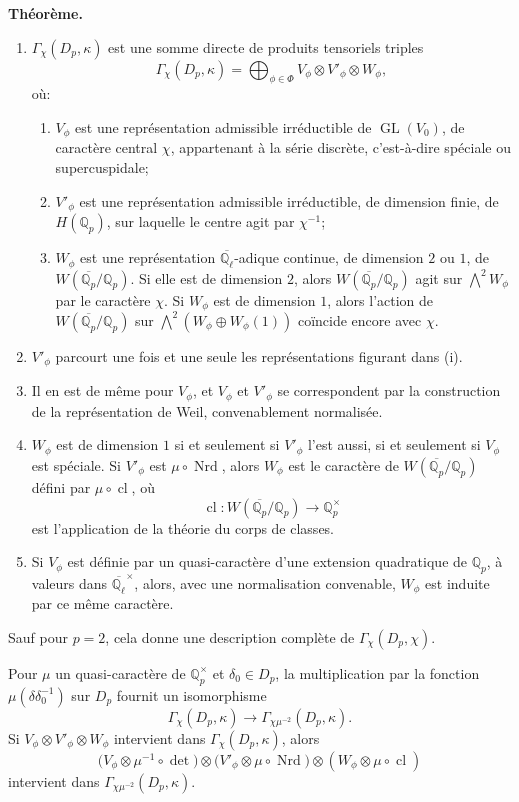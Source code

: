 \documentclass[11pt]{article}
\newcommand{\Qp}{\mathbb{Q}_{p}}
\newcommand{\Ql}{\mathbb{Q}_{\ell}}
\newcommand{\GL}{\operatorname{GL}}
\newcommand{\Nrd}{\operatorname{Nrd}}
\newcommand{\cl}{\operatorname{cl}}
\begin{document}
\textbf{Théorème.}
\begin{enumerate}[label=(\roman*)]
\item \(\Gamma_{\chi}(D_p,\kappa)\) est une somme directe de produits tensoriels triples
\[
\Gamma_{\chi}(D_p,\kappa)=
\bigoplus_{\phi\in\Phi}V_{\phi}\otimes V'_{\phi}\otimes W_{\phi},
\]
où:
\begin{enumerate}[label=(\alph*)]
\item \(V_{\phi}\) est une représentation admissible irréductible de \(\GL(V_0)\), de caractère central \(\chi\), appartenant à la série discrète, c'est-à-dire spéciale ou supercuspidale;
\item \(V'_{\phi}\) est une représentation admissible irréductible, de dimension finie, de \(H(\Qp)\), sur laquelle le centre agit par \(\chi^{-1}\);
\item \(W_{\phi}\) est une représentation \(\overline{\Ql}\)-adique continue, de dimension \(2\) ou \(1\), de \(W(\overline{\Qp}/\Qp)\). Si elle est de dimension \(2\), alors \(W(\overline{\Qp}/\Qp)\) agit sur \(\bigwedge^2W_{\phi}\) par le caractère \(\chi\). Si \(W_{\phi}\) est de dimension \(1\), alors l'action de \(W(\overline{\Qp}/\Qp)\) sur \(\bigwedge^2(W_{\phi}\oplus W_{\phi}(1))\) coïncide encore avec \(\chi\).
\end{enumerate}
\item \(V'_{\phi}\) parcourt une fois et une seule les représentations figurant dans (i).
\item Il en est de même pour \(V_{\phi}\), et \(V_{\phi}\) et \(V'_{\phi}\) se correspondent par la construction de la représentation de Weil, convenablement normalisée.
\item \(W_{\phi}\) est de dimension \(1\) si et seulement si \(V'_{\phi}\) l'est aussi, si et seulement si \(V_{\phi}\) est spéciale. Si \(V'_{\phi}\) est \(\mu\circ\Nrd\), alors \(W_{\phi}\) est le caractère de \(W(\overline{\Qp}/\Qp)\) défini par \(\mu\circ\cl\), où
\[
\cl:W(\overline{\Qp}/\Qp)\to\Qp^\times
\]
est l'application de la théorie du corps de classes.
\item Si \(V_{\phi}\) est définie par un quasi-caractère d'une extension quadratique de \(\Qp\), à valeurs dans \(\overline{\Ql}^{\times}\), alors, avec une normalisation convenable, \(W_{\phi}\) est induite par ce même caractère.
\end{enumerate}

Sauf pour \(p=2\), cela donne une description complète de \(\Gamma_{\chi}(D_p,\chi)\).

Pour \(\mu\) un quasi-caractère de \(\Qp^\times\) et \(\delta_0\in D_p\), la multiplication par la fonction \(\mu(\delta\delta_0^{-1})\) sur \(D_p\) fournit un isomorphisme
\[
\Gamma_{\chi}(D_p,\kappa)\longrightarrow
\Gamma_{\chi\mu^{-2}}(D_p,\kappa).
\]
Si \(V_{\phi}\otimes V'_{\phi}\otimes W_{\phi}\) intervient dans \(\Gamma_{\chi}(D_p,\kappa)\), alors
\[
\bigl(V_{\phi}\otimes\mu^{-1}\circ\det\bigr)\otimes
\bigl(V'_{\phi}\otimes\mu\circ\Nrd\bigr)\otimes
(W_{\phi}\otimes\mu\circ\cl)
\]
intervient dans \(\Gamma_{\chi\mu^{-2}}(D_p,\kappa)\).
\end{document}
